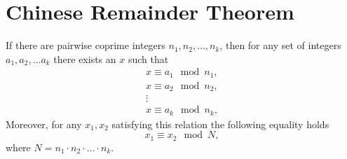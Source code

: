 \section{Chinese Remainder Theorem}

\begin{theorem}
\label{thm:chineseremainder}
If there are pairwise coprime integers $n_1, n_2, \dots, n_k$, then
for any set of integers $a_1, a_2, \dots a_k$ there exists an $x$ such that 
\begin{eqnarray}
x \equiv a_1 \mod n_1,
\nonumber \\
x \equiv a_2 \mod n_2,
\nonumber \\
\vdots \nonumber \\
x \equiv a_k \mod n_k,
\end{eqnarray}
Moreover, for any $x_1, x_2$ satisfying this relation the following equality holds
\[
x_1 \equiv x_2 \mod N,
\]
where $N = n_1 \cdot n_2 \cdot \dots \cdot n_k$.
\end{theorem}